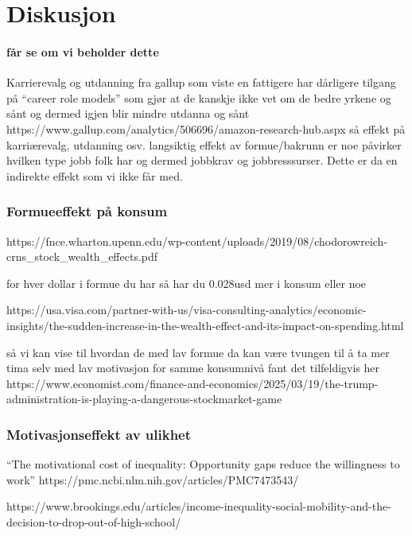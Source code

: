 \documentclass[
  12pt,
  a4paper,
  DIV=11,
  numbers=noendperiod]{scrartcl}
\let\oldparagraph\paragraph
\renewcommand{\paragraph}[1]{\oldparagraph{#1}\mbox{}}
\begin{document}
\section{Diskusjon}\label{diskusjon}

\paragraph{får se om vi beholder
dette}\label{fuxe5r-se-om-vi-beholder-dette}

Karrierevalg og utdanning fra gallup som viste en fattigere har
dårligere tilgang på ``career role models'' som gjør at de kanskje ikke
vet om de bedre yrkene og sånt og dermed igjen blir mindre utdanna og
sånt https://www.gallup.com/analytics/506696/amazon-research-hub.aspx så
effekt på karriærevalg, utdanning osv. langsiktig effekt av
formue/bakrunn er noe påvirker hvilken type jobb folk har og dermed
jobbkrav og jobbresssurser. Dette er da en indirekte effekt som vi ikke
får med.

\subsubsection{Formueeffekt på konsum}\label{formueeffekt-puxe5-konsum}

https://fnce.wharton.upenn.edu/wp-content/uploads/2019/08/chodorowreich-crns\_stock\_wealth\_effects.pdf

for hver dollar i formue du har så har du 0.028usd mer i konsum eller
noe

https://usa.visa.com/partner-with-us/visa-consulting-analytics/economic-insights/the-sudden-increase-in-the-wealth-effect-and-its-impact-on-spending.html

så vi kan vise til hvordan de med lav formue da kan være tvungen til å
ta mer tima selv med lav motivasjon for samme konsumnivå fant det
tilfeldigvis her
https://www.economist.com/finance-and-economics/2025/03/19/the-trump-administration-is-playing-a-dangerous-stockmarket-game

\subsubsection{Motivasjonseffekt av
ulikhet}\label{motivasjonseffekt-av-ulikhet}

``The motivational cost of inequality: Opportunity gaps reduce the
willingness to work'' https://pmc.ncbi.nlm.nih.gov/articles/PMC7473543/

https://www.brookings.edu/articles/income-inequality-social-mobility-and-the-decision-to-drop-out-of-high-school/
\end{document}
